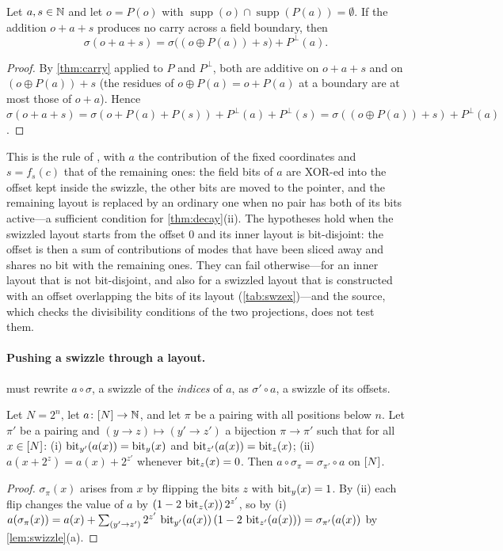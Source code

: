 \begin{proposition}\label{prop:fields}
Let $a,s\in\mathbb{N}$ and let $o=P(o)$ with $\operatorname{supp}(o)\cap\operatorname{supp}(P(a))=\emptyset$.
If the addition $o+a+s$ produces no carry across a field boundary, then
\[ \sigma(o+a+s)=\sigma\bigl((o\oplus P(a))+s\bigr)+P^\perp(a). \]
\end{proposition}
\begin{proof}
By \cref{thm:carry} applied to $P$ and $P^\perp$, both are additive on $o+a+s$ and on
$(o\oplus P(a))+s$ (the residues of $o\oplus P(a)=o+P(a)$ at a boundary are at most those of
$o+a$). Hence
$\sigma(o+a+s)=\sigma(o+P(a)+P(s))+P^\perp(a)+P^\perp(s)=\sigma((o\oplus P(a))+s)+P^\perp(a)$.
\end{proof}

\noindent This is the rule of , with $a$ the contribution of the fixed
coordinates and $s=f_s(c)$ that of the remaining ones: the field bits of $a$ are XOR-ed into the
offset kept inside the swizzle, the other bits are moved to the pointer, and the remaining
layout is replaced by an ordinary one when no pair has both of its bits active---a sufficient
condition for \cref{thm:decay}(ii). The hypotheses hold when the swizzled layout starts from the
offset $0$ and its inner layout is bit-disjoint: the offset is then a sum of contributions of
modes that have been sliced away and shares no bit with the remaining ones. They can fail
otherwise---for an inner layout that is not bit-disjoint, and also for a swizzled layout that is
constructed with an offset overlapping the bits of its layout (\cref{tab:swzex})---and the
source, which checks the divisibility conditions of the two projections, does not test them.

\paragraph{Pushing a swizzle through a layout.}
 must rewrite $a\circ\sigma$, a swizzle of the \emph{indices} of
$a$, as $\sigma'\circ a$, a swizzle of its offsets.

\begin{proposition}[transport]\label{prop:transport}
Let $N=2^n$, let $a\colon[N]\to\mathbb{N}$, and let $\pi$ be a pairing with all positions below $n$.
Let $\pi'$ be a pairing and $(y\to z)\mapsto(y'\to z')$ a bijection $\pi\to\pi'$ such that for all
$x\in[N]$: {\rm(i)} $\operatorname{bit}_{y'}(a(x))=\operatorname{bit}_y(x)$ and $\operatorname{bit}_{z'}(a(x))=\operatorname{bit}_z(x)$; {\rm(ii)}
$a(x+2^z)=a(x)+2^{z'}$ whenever $\operatorname{bit}_z(x)=0$. Then $a\circ\sigma_\pi=\sigma_{\pi'}\circ a$ on
$[N]$.
\end{proposition}
\begin{proof}
$\sigma_\pi(x)$ arises from $x$ by flipping the bits $z$ with $\operatorname{bit}_y(x)=1$. By (ii) each flip
changes the value of $a$ by $(1-2\,\operatorname{bit}_z(x))\,2^{z'}$, so by (i)
$a(\sigma_\pi(x))=a(x)+\sum_{(y'\to z')}2^{z'}\,\operatorname{bit}_{y'}(a(x))\,(1-2\,\operatorname{bit}_{z'}(a(x)))=\sigma_{\pi'}(a(x))$
by \cref{lem:swizzle}(a).
\end{proof}

